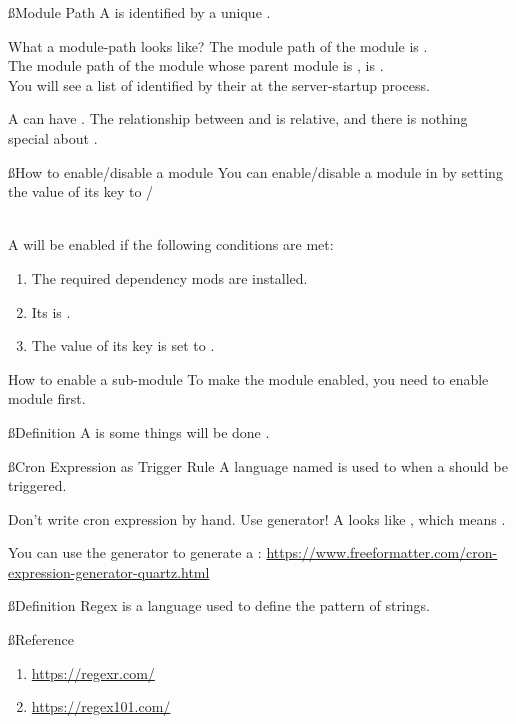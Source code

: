 \ss{Module Path}
A  is identified by a unique .
\begin{example}{What a module-path looks like?}
    The module path of the module  is . \\
    The module path of the module  whose parent module is , is . \\
    You will see a list of  identified by their  at the server-startup process.
\end{example}
A  can have .
The relationship between  and  is relative, and there is nothing special about .

\ss{How to enable/disable a module}
You can enable/disable a module in  by setting the value of its  key to /
\\
\\
\begin{samepage}
    A  will be enabled if the following conditions are met:
    \begin{enumerate}
        \item The required dependency mods are installed.
        \item Its  is .
        \item The value of its  key is set to .
    \end{enumerate}
\end{samepage}

\begin{example}{How to enable a sub-module}
    To make the module  enabled, you need to enable  module first.
\end{example}


\clearpage
{}\label{sec:job}

\ss{Definition}
A  is some things will be done .

\ss{Cron Expression as Trigger Rule}
A language named  is used to  when a  should be triggered.

\begin{tips}{Don't write cron expression by hand. Use generator!}
    A  looks like , which means .

    You can use the generator to generate a :
    \url{https://www.freeformatter.com/cron-expression-generator-quartz.html}
\end{tips}

\clearpage
{}

\ss{Definition}
Regex is a language used to define the pattern of strings.

\ss{Reference}
\begin{enumerate}
    \item \url{https://regexr.com/}
    \item \url{https://regex101.com/}
\end{enumerate}




